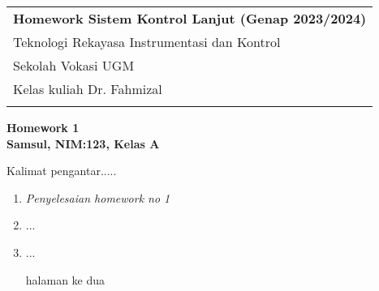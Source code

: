 \documentclass[a4paper,12pt]{article}
\begin{document}

\begin{tabular}{p{15.5cm}} 
{\large \bf Homework Sistem Kontrol Lanjut (Genap 2023/2024)} \\
Teknologi Rekayasa Instrumentasi dan Kontrol \\ Sekolah Vokasi UGM \\ Kelas kuliah Dr. Fahmizal\\
\hline %
\\
\end{tabular}
\vspace*{0.3cm} 

\begin{center} 
	{\Large \bf Homework 1} 
	\vspace{2mm} \\
	{\bf Samsul, NIM:123, Kelas A}
		
\end{center}  

\vspace{0.4cm}

Kalimat pengantar.....

\begin{enumerate}

\item {\it Penyelesaian homework no 1}

\item ...

\item ...

\newpage

halaman ke dua

\end{enumerate}
\end{document}
